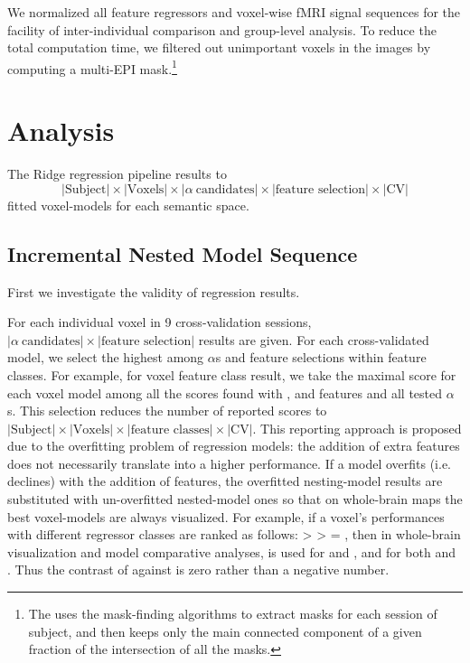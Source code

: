 We normalized all feature regressors and voxel-wise fMRI signal sequences for the facility of inter-individual comparison and group-level analysis. To reduce the total computation time, we filtered out unimportant voxels in the images by computing a multi-EPI mask.\footnote{The  uses the mask-finding algorithms to extract masks for each session of subject, and then keeps only the main connected component of a given fraction  of the intersection of all the masks.}

\section{Analysis}

The Ridge regression pipeline results to \[ \lvert \text{Subject} \rvert \times \lvert \text{Voxels} \rvert \times \lvert \alpha~\text{candidates} \rvert \times \lvert \text{feature selection} \rvert \times \lvert \text{CV} \rvert \] fitted voxel-models for each semantic space. 


\subsection{Incremental Nested Model Sequence}

First we investigate the validity of regression results. 

For each individual voxel in 9 cross-validation sessions, \( \lvert \alpha~\text{candidates} \rvert \times \lvert \text{feature selection} \rvert \) results are given. For each cross-validated model, we select the highest  among \(\alpha\)s and feature selections within feature classes. For example, for voxel   feature class result, we take the maximal  score for each voxel  model among all the scores found with ,  and  features and all tested \(\alpha\)s. This selection reduces the number of reported scores to \( \lvert \text{Subject} \rvert \times \lvert \text{Voxels} \rvert \times \lvert \text{feature classes} \rvert \times \lvert \text{CV} \rvert \). This reporting approach is proposed due to the overfitting problem of regression models: the addition of extra features does not necessarily translate into a higher performance. If a model overfits (i.e.  declines) with the addition of features, the overfitted nesting-model results are substituted with un-overfitted nested-model ones so that on whole-brain maps the best voxel-models are always visualized. For example, if a voxel's  performances with different regressor classes are ranked as follows:  >  >  = , then in whole-brain visualization and model comparative analyses,   is used for  and , and   for both  and . Thus the contrast of  against  is zero rather than a negative number.

